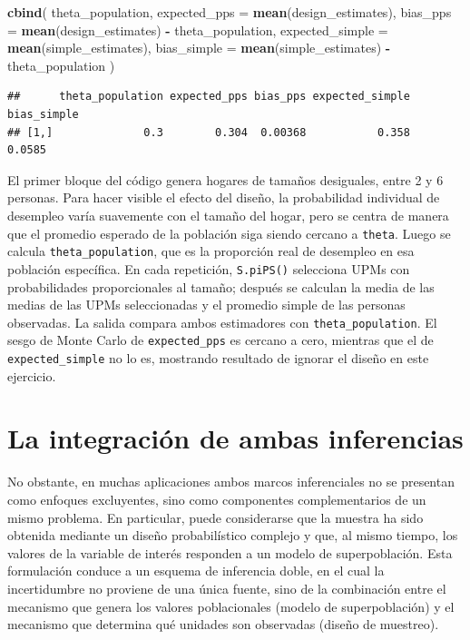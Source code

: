\documentclass[
  spanish,
  12pt,
]{book}
\newenvironment{Shaded}{\begin{snugshade}}{\end{snugshade}}
\newcommand{\AttributeTok}[1]{\textcolor[rgb]{0.13,0.29,0.53}{#1}}
\newcommand{\FunctionTok}[1]{\textcolor[rgb]{0.13,0.29,0.53}{\textbf{#1}}}
\newcommand{\NormalTok}[1]{#1}
\newcommand{\SpecialCharTok}[1]{\textcolor[rgb]{0.81,0.36,0.00}{\textbf{#1}}}
\begin{document}
\begin{Shaded}
\begin{Highlighting}[]
\FunctionTok{cbind}\NormalTok{(}
\NormalTok{  theta\_population,}
  \AttributeTok{expected\_pps =} \FunctionTok{mean}\NormalTok{(design\_estimates),}
  \AttributeTok{bias\_pps =} \FunctionTok{mean}\NormalTok{(design\_estimates) }\SpecialCharTok{{-}}\NormalTok{ theta\_population,}
  \AttributeTok{expected\_simple =} \FunctionTok{mean}\NormalTok{(simple\_estimates),}
  \AttributeTok{bias\_simple =} \FunctionTok{mean}\NormalTok{(simple\_estimates) }\SpecialCharTok{{-}}\NormalTok{ theta\_population}
\NormalTok{)}
\end{Highlighting}
\end{Shaded}

\begin{verbatim}
##      theta_population expected_pps bias_pps expected_simple bias_simple
## [1,]              0.3        0.304  0.00368           0.358      0.0585
\end{verbatim}

El primer bloque del código genera hogares de tamaños desiguales, entre 2 y 6 personas. Para hacer visible el efecto del diseño, la probabilidad individual de desempleo varía suavemente con el tamaño del hogar, pero se centra de manera que el promedio esperado de la población siga siendo cercano a \texttt{theta}. Luego se calcula \texttt{theta\_population}, que es la proporción real de desempleo en esa población específica. En cada repetición, \texttt{S.piPS()} selecciona UPMs con probabilidades proporcionales al tamaño; después se calculan la media de las medias de las UPMs seleccionadas y el promedio simple de las personas observadas. La salida compara ambos estimadores con \texttt{theta\_population}. El sesgo de Monte Carlo de \texttt{expected\_pps} es cercano a cero, mientras que el de \texttt{expected\_simple} no lo es, mostrando resultado de ignorar el diseño en este ejercicio.

\section{La integración de ambas inferencias}\label{la-integracion-de-ambas-inferencias}

No obstante, en muchas aplicaciones ambos marcos inferenciales no se presentan como enfoques excluyentes, sino como componentes complementarios de un mismo problema. En particular, puede considerarse que la muestra ha sido obtenida mediante un diseño probabilístico complejo y que, al mismo tiempo, los valores de la variable de interés responden a un modelo de superpoblación. Esta formulación conduce a un esquema de inferencia doble, en el cual la incertidumbre no proviene de una única fuente, sino de la combinación entre el mecanismo que genera los valores poblacionales (modelo de superpoblación) y el mecanismo que determina qué unidades son observadas (diseño de muestreo).
\end{document}
